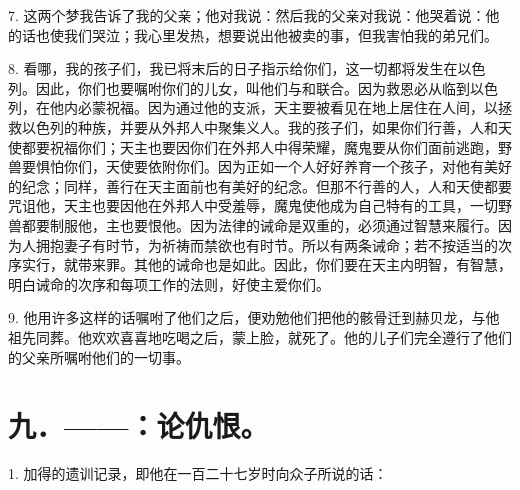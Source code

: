 7. 这两个梦我告诉了我的父亲；他对我说：然后我的父亲对我说：他哭着说：他的话也使我们哭泣；我心里发热，想要说出他被卖的事，但我害怕我的弟兄们。\par

8. 看哪，我的孩子们，我已将末后的日子指示给你们，这一切都将发生在以色列。因此，你们也要嘱咐你们的儿女，叫他们与和联合。因为救恩必从临到以色列，在他内必蒙祝福。因为通过他的支派，天主要被看见在地上居住在人间，以拯救以色列的种族，并要从外邦人中聚集义人。我的孩子们，如果你们行善，人和天使都要祝福你们；天主也要因你们在外邦人中得荣耀，魔鬼要从你们面前逃跑，野兽要惧怕你们，天使要依附你们。因为正如一个人好好养育一个孩子，对他有美好的纪念；同样，善行在天主面前也有美好的纪念。但那不行善的人，人和天使都要咒诅他，天主也要因他在外邦人中受羞辱，魔鬼使他成为自己特有的工具，一切野兽都要制服他，主也要恨他。因为法律的诫命是双重的，必须通过智慧来履行。因为人拥抱妻子有时节，为祈祷而禁欲也有时节。所以有两条诫命；若不按适当的次序实行，就带来罪。其他的诫命也是如此。因此，你们要在天主内明智，有智慧，明白诫命的次序和每项工作的法则，好使主爱你们。\par

9. 他用许多这样的话嘱咐了他们之后，便劝勉他们把他的骸骨迁到赫贝龙，与他祖先同葬。他欢欢喜喜地吃喝之后，蒙上脸，就死了。他的儿子们完全遵行了他们的父亲所嘱咐他们的一切事。\par


\section{九．——：论仇恨。}

1. 加得的遗训记录，即他在一百二十七岁时向众子所说的话：\par


